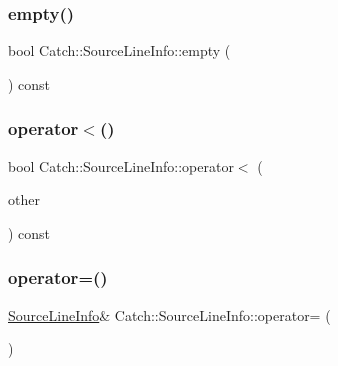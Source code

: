 \subsubsection{\texorpdfstring{empty()}{empty()}}
{\footnotesize\ttfamily bool Catch\+::\+Source\+Line\+Info\+::empty (\begin{DoxyParamCaption}{ }\end{DoxyParamCaption}) const\hspace{0.3cm}{\ttfamily [noexcept]}}

\mbox{\label{struct_catch_1_1_source_line_info_af77415416919d2d6030b4be085b92f7a}} 
\subsubsection{\texorpdfstring{operator$<$()}{operator<()}}
{\footnotesize\ttfamily bool Catch\+::\+Source\+Line\+Info\+::operator$<$ (\begin{DoxyParamCaption}\item[{\mbox{\hyperlink{struct_catch_1_1_source_line_info}{Source\+Line\+Info}} const \&}]{other }\end{DoxyParamCaption}) const\hspace{0.3cm}{\ttfamily [noexcept]}}

\mbox{\label{struct_catch_1_1_source_line_info_a1a6cfc0197357ef4e329bb256aa8a354}} 
\subsubsection{\texorpdfstring{operator=()}{operator=()}\hspace{0.1cm}{\footnotesize\ttfamily [1/2]}}
{\footnotesize\ttfamily \mbox{\hyperlink{struct_catch_1_1_source_line_info}{Source\+Line\+Info}}\& Catch\+::\+Source\+Line\+Info\+::operator= (\begin{DoxyParamCaption}\item[{\mbox{\hyperlink{struct_catch_1_1_source_line_info}{Source\+Line\+Info}} const \&}]{ }\end{DoxyParamCaption})\hspace{0.3cm}{\ttfamily [default]}}

